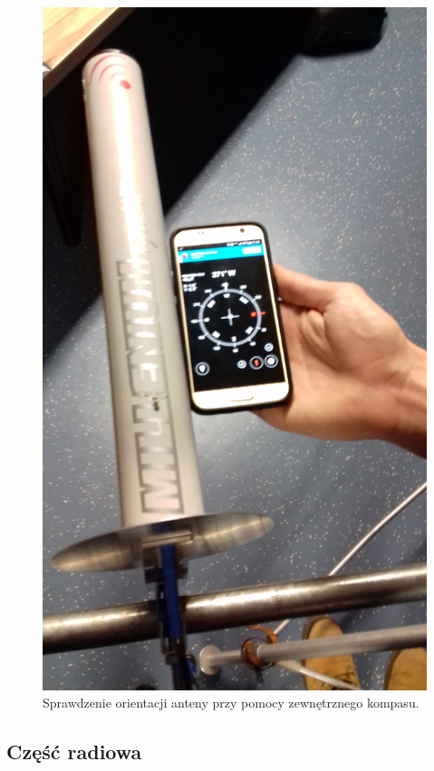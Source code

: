 \begin{figure}[!htbp]
 \includegraphics[width=\textwidth]{test_kierunku}
 \centering
 \caption{Sprawdzenie orientacji anteny przy pomocy zewnętrznego kompasu.}
 \label{kompas}
\end{figure}


\subsection{Część radiowa}


